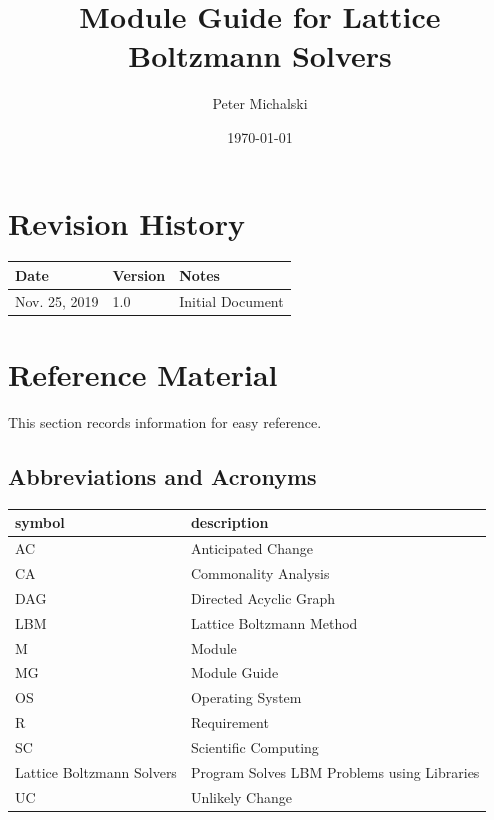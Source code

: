 \documentclass[12pt, titlepage]{article}
\newcommand{\famname}{Lattice Boltzmann Solvers} %
\begin{document}
\title{Module Guide for \famname{}} 
\author{Peter Michalski}
\date{\today}

\maketitle


\section{Revision History} \label{MGREVHISTORY}

\begin{tabularx}{\textwidth}{p{3cm}p{2cm}X}
\toprule {\bf Date} & {\bf Version} & {\bf Notes}\\
\midrule
Nov. 25, 2019 & 1.0 & Initial Document\\
\bottomrule
\end{tabularx}

\newpage

\section{Reference Material}

This section records information for easy reference.

\subsection{Abbreviations and Acronyms}

\renewcommand{\arraystretch}{1.2}
\begin{tabular}{l l} 
  \toprule		
  \textbf{symbol} & \textbf{description}\\
  \midrule 
  AC & Anticipated Change\\
  CA & Commonality Analysis\\
  DAG & Directed Acyclic Graph \\
  LBM & Lattice Boltzmann Method\\
  M & Module \\
  MG & Module Guide \\
  OS & Operating System \\
  R & Requirement\\
  SC & Scientific Computing \\
  \famname & Program Solves LBM Problems using Libraries\\
  UC & Unlikely Change \\
  \bottomrule
\end{tabular}\\
\end{document}
